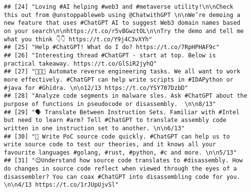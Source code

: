 \documentclass[
]{article}
\begin{document}
\begin{verbatim}
## [24] "Loving #AI helping #web3 and #metaverse utility!\n\nCheck this out from @unstoppableweb using @ChatwithGPT \n\nWe’re demoing a  new feature that uses #ChatGPT AI to suggest Web3 domain names based on your search\n\nhttps://t.co/r5vBGwztOL\n\nTry the demo and tell me what you think 👇👇 https://t.co/Y9j4C3vXYh"         
## [25] "Help #ChatGPT! What do I do? https://t.co/7RpHPHAF9c"                                                                                                                                                                                                                                                                           
## [26] "Interesting thread #ChatGPT - start at top. Below is practical takeaway. https://t.co/GlSiR2jyhQ"                                                                                                                                                                                                                               
## [27] "👩🏿‍💻 Automate reverse engineering tasks. We all want to work more effectively. #ChatGPT can help write scripts in #IDAPython or #java for #Ghidra. \n\n12/13 https://t.co/YSY707DzbD"                                                                                                                                         
## [28] "Analyze code segments in malware sles. Ask #ChatGPT about the purpose of functions in pseudocode or disassembly.  \n\n8/13"                                                                                                                                                                                                     
## [29] "🗣️ Translate Between Instruction Sets. Familiar with #Intel but need to learn #arm? Tell #ChatGPT to translate assembly code written in one instruction set to another. \n\n6/13"                                                                                                                                                
## [30] "🧪 Write PoC source code quickly. #ChatGPT can help us to write source code to test our theories, and it knows all your favourite languages #golang, #rust, #python, #c and more. \n\n5/13"                                                                                                                                     
## [31] "😉Understand how source code translates to #disassembly. How do changes in source code reflect when viewed through the eyes of a disassembler? You can coax #ChatGPT into disassembling code for you.  \n\n4/13 https://t.co/1rJUpUjvSl"                                                                                        

\end{verbatim}
\end{document}
